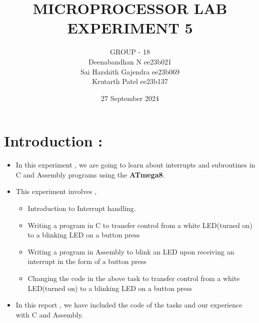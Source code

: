 \documentclass{article}
\title{MICROPROCESSOR LAB EXPERIMENT 5}
\author{GROUP - 18 \\ Deenabandhan N ee23b021 \\ Sai Harshith Gajendra ee23b069 \\ Krutarth Patel ee23b137}
\date{27 September 2024}
\begin{document}
\maketitle
\section*{Introduction :}
\begin{itemize}
	\item In this experiment , we are going to learn about interrupts and subroutines in C and Assembly programs using the \textbf{ATmega8}.
    \item This experiment involves ,
    \begin{itemize}
        \item Introduction to Interrupt handling.
		\item Writing a program in C to transfer control from a white LED(turned on) to a blinking LED on a button press
        \item Writing a program in Assembly to blink an LED upon receiving an interrupt in the form of a button press
        \item Changing the code in the above task to transfer control from a white LED(turned on) to a blinking LED on a button press
    \end{itemize}
    \item In this report , we have included the code of the tasks and our experience with C and Assembly. 
\end{itemize}
\end{document}
